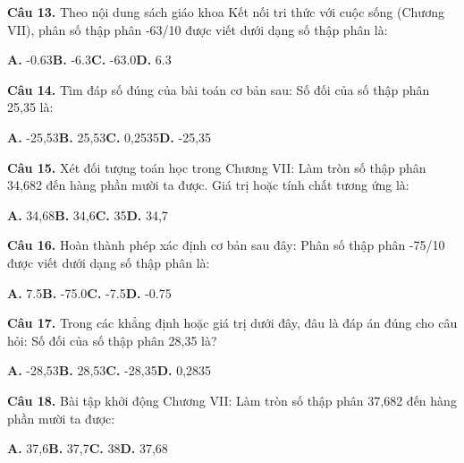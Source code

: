\documentclass[11pt,a4paper]{article}
\begin{document}
\textbf{\color{primary} Câu 13.} Theo nội dung sách giáo khoa Kết nối tri thức với cuộc sống (Chương VII), phân số thập phân -63/10 được viết dưới dạng số thập phân là:\par
\hspace*{1.5em}\textbf{A.} -0.63\quad\quad \textbf{B.} -6.3\quad\quad \textbf{C.} -63.0\quad\quad \textbf{D.} 6.3\par\vspace{2pt}
\textbf{\color{primary} Câu 14.} Tìm đáp số đúng của bài toán cơ bản sau: Số đối của số thập phân 25,35 là:\par
\hspace*{1.5em}\textbf{A.} -25,53\quad\quad \textbf{B.} 25,53\quad\quad \textbf{C.} 0,2535\quad\quad \textbf{D.} -25,35\par\vspace{2pt}
\textbf{\color{primary} Câu 15.} Xét đối tượng toán học trong Chương VII: Làm tròn số thập phân 34,682 đến hàng phần mười ta được. Giá trị hoặc tính chất tương ứng là:\par
\hspace*{1.5em}\textbf{A.} 34,68\quad\quad \textbf{B.} 34,6\quad\quad \textbf{C.} 35\quad\quad \textbf{D.} 34,7\par\vspace{2pt}
\textbf{\color{primary} Câu 16.} Hoàn thành phép xác định cơ bản sau đây: Phân số thập phân -75/10 được viết dưới dạng số thập phân là:\par
\hspace*{1.5em}\textbf{A.} 7.5\quad\quad \textbf{B.} -75.0\quad\quad \textbf{C.} -7.5\quad\quad \textbf{D.} -0.75\par\vspace{2pt}
\textbf{\color{primary} Câu 17.} Trong các khẳng định hoặc giá trị dưới đây, đâu là đáp án đúng cho câu hỏi: Số đối của số thập phân 28,35 là?\par
\hspace*{1.5em}\textbf{A.} -28,53\quad\quad \textbf{B.} 28,53\quad\quad \textbf{C.} -28,35\quad\quad \textbf{D.} 0,2835\par\vspace{2pt}
\textbf{\color{primary} Câu 18.} Bài tập khởi động Chương VII: Làm tròn số thập phân 37,682 đến hàng phần mười ta được:\par
\hspace*{1.5em}\textbf{A.} 37,6\quad\quad \textbf{B.} 37,7\quad\quad \textbf{C.} 38\quad\quad \textbf{D.} 37,68\par\vspace{2pt}
\end{document}
